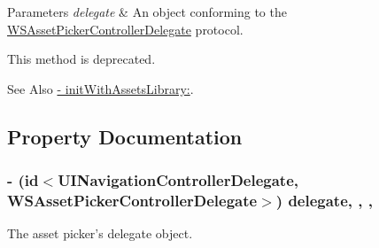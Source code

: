 \begin{DoxyParams}{Parameters}
{\em delegate} & An object conforming to the {\ttfamily \hyperlink{class_w_s_asset_picker_controller_delegate-p}{W\-S\-Asset\-Picker\-Controller\-Delegate}} protocol.\\
\hline
\end{DoxyParams}
This method is deprecated. \begin{DoxySeeAlso}{See Also}
{\ttfamily \hyperlink{interface_w_s_asset_picker_controller_a85dd3e1da34cb38f5c82ba024fa3d4f2}{-\/ init\-With\-Assets\-Library\-:}}. 
\end{DoxySeeAlso}


\subsection{Property Documentation}
\hypertarget{interface_w_s_asset_picker_controller_a357974ec00d4a177eb2b53117d834371}{
\subsubsection[{delegate}]{\setlength{\rightskip}{0pt plus 5cm}-\/ (id$<$U\-I\-Navigation\-Controller\-Delegate, W\-S\-Asset\-Picker\-Controller\-Delegate$>$) delegate\hspace{0.3cm}{\ttfamily [read]}, {\ttfamily [write]}, {\ttfamily [nonatomic]}, {\ttfamily [weak]}}}\label{interface_w_s_asset_picker_controller_a357974ec00d4a177eb2b53117d834371}
The asset picker's delegate object.

